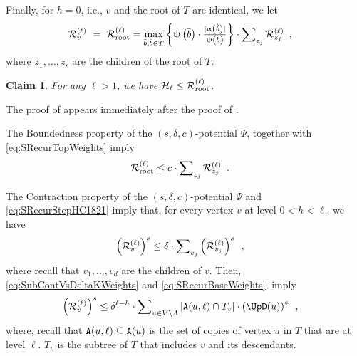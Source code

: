\documentclass[11pt,reqno]{amsart}
\numberwithin{equation}{section}
\newtheorem{claim}[theorem]{Claim}
\newcommand{\applegreen}[1]{ {\color{applegreen}#1}}
\newcommand{\blue}[1]{{\color{blue}#1}}
\newcommand{\bostonuniversityred}[1]{{\color{bostonuniversityred}#1}}
\newcommand{\cadmiumgreen}[1]{{\color{cadmiumgreen}#1}}
\newcommand{\cadmiumorange}[1]{{\color{cadmiumorange}#1}}
\newcommand{\coquelicot}[1]{{\color{coquelicot}#1}}
\newcommand{\darkmagenta}[1]{{\color{darkmagenta}#1}}
\newcommand{\deeppink}[1]{{\color{deeppink}#1}}
\newcommand{\electricviolet}[1]{{\color{electricviolet}#1}}
\newcommand{\red}[1]{{\color{red}#1}}
\newcommand{\potF}{{\Psi}}
\newcommand{\pfs}{\darkmagenta{s}}
\newcommand{\cp}{{\tt A}}
\newcommand{\abs}[1]{\blue{|}#1\blue{|}}
\renewcommand{\applegreen}[1]{#1}
\renewcommand{\blue}[1]{#1}
\renewcommand{\bostonuniversityred}[1]{#1}
\renewcommand{\cadmiumgreen}[1]{#1}
\renewcommand{\cadmiumorange}[1]{#1}
\renewcommand{\coquelicot}[1]{#1}
\renewcommand{\darkmagenta}[1]{#1}
\renewcommand{\deeppink}[1]{#1}
\renewcommand{\electricviolet}[1]{#1}
\renewcommand{\red}[1]{#1}
\newcommand{\kb}{\deeppink{b}}
\newcommand{\kh}{\cadmiumorange{h}}
\newcommand{\kj}{\coquelicot{j}}
\newcommand{\kell}{{\color{green(pigment)}\ell}}%
\newcommand{\kr}{\bostonuniversityred{r}}%
\newcommand{\ku}{\red{u}}
\newcommand{\kv}{\electricviolet{v}}
\newcommand{\kz}{\cadmiumgreen{z}}
\renewcommand{\kb}{b}
\renewcommand{\kh}{h}
\renewcommand{\kj}{j}
\renewcommand{\kell}{\ell}
\renewcommand{\kr}{r}
\renewcommand{\ku}{u}
\renewcommand{\kv}{v}
\renewcommand{\kz}{z}
\newcommand{\infweight}{\upalpha}
\begin{document}
Finally, for $\kh=0$, i.e., $\kv$ and the root of $T$ are identical, we let 
\begin{align}\label{eq:SRecurTopWeights}
\subcont_{\kv}\ = \ \subcont_{\rm root} & =  
\max_{\bar{\kb},\hat{\kb}\in T} \left\{ {\textstyle \chiofh\left(\bar{\kb}\right) \cdot \frac{\abs{ \infweight\left(\hat{\kb}\right)}}{\chiofh\left(\hat{\kb}\right)}} \right\} 
\cdot \sum\nolimits_{\kz_{\kj}} \subcont_{\kz_{\kj}} \enspace,
\end{align}
where $\kz_1, \ldots, \kz_{\kr}$ are the children of the root of $T$. 

\begin{claim}\label{claim:CEllVsCalD}
For any $\kell> 1$, we have $\inflPotB_{\kell} \leq \subcont_{\rm root}$. 
\end{claim}
The proof of  appears immediately after the proof of .

The Boundedness property of the $(\pfs,\delta,c)$-potential $\potF$, together with \eqref{eq:SRecurTopWeights} 
imply
\begin{align}\label{eq:SRecurTopWeightsB}
\subcont_{\rm root} & \leq %
c \cdot \sum\nolimits_{\kz_j} \subcont_{\kz_j} \enspace.
\end{align}
% 


\noindent
The Contraction property  of the $(\pfs,\delta,c)$-potential $\potF$ and \eqref{eq:SRecurStepHC1821}
imply that, for every vertex $\kv$ at level $0<\kh<\kell$, we have 
\begin{align}\label{eq:SubContVsDeltaKWeights}
\left( \subcont_{\kv} \right) ^{\pfs} & \leq 
\delta \cdot \sum\nolimits_{\kv_j} \left( \subcont_{\kv_j} \right)^{\pfs} \enspace,
\end{align}
where recall that $\kv_1,\ldots, \kv_d$ are the children of $\kv$. 
%
Then, \eqref{eq:SubContVsDeltaKWeights} and \eqref{eq:SRecurBaseWeights}, imply 
% 
\begin{align}\label{eq:SubContVsDeltaKWeights1821}
 \left ( \subcont_{\kv} \right)^{\pfs} &
 \leq \delta^{\kell - \kh }\cdot \sum\nolimits_{\ku\in V\setminus \Lambda}  \abs{\cp(\ku,\kell)\cap T_{\kv}} \cdot 
\left ( \UpD(\ku)\right)^{\pfs} \enspace ,
\end{align}
%
%
where, recall that $\cp(\ku,\kell)\subseteq \cp(\ku)$ is the set of copies of vertex $\ku$ in $T$
that are at level $\kell$. $T_{\kv}$ is the subtree of $T$ that includes $\kv$ and its descendants. 
\end{document}
